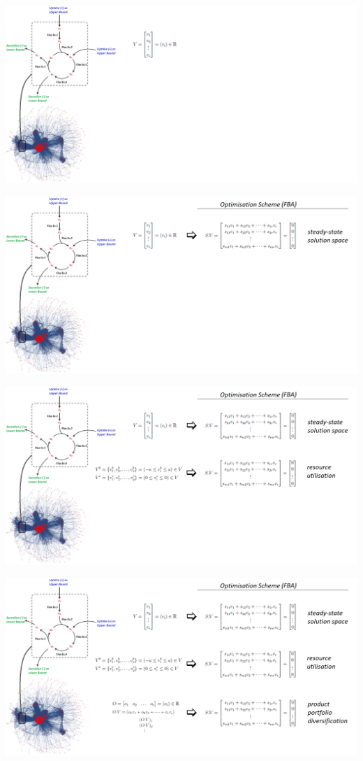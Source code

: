 \begin{frame}
	\includegraphics[width=\textwidth]{../tables/fba_3.png}
\end{frame}
\begin{frame}
	\includegraphics[width=\textwidth]{../tables/fba_4.png}
\end{frame}
\begin{frame}
	\includegraphics[width=\textwidth]{../tables/fba_5.png}
\end{frame}
\begin{frame}
	\includegraphics[width=\textwidth]{../tables/fba_6.png}
\end{frame}
